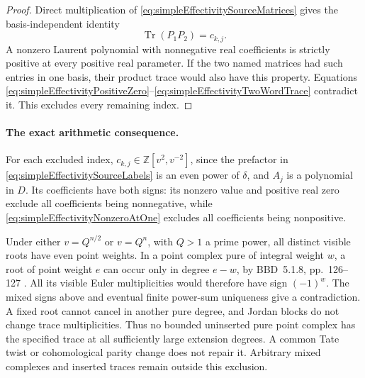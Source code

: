 \begin{proof}
Direct multiplication of
\eqref{eq:simpleEffectivitySourceMatrices} gives the
basis-independent identity
\begin{equation}\label{eq:simpleEffectivityTwoWordTrace}
                    \operatorname{Tr}(P_1P_2)=c_{k,j}.
\end{equation}
A nonzero Laurent polynomial with nonnegative real
coefficients is strictly positive at every positive
real parameter. If the two named matrices had such
entries in one basis, their product trace would also
have this property. Equations
\eqref{eq:simpleEffectivityPositiveZero}--\eqref{eq:simpleEffectivityTwoWordTrace}
contradict it. This excludes every remaining index.
\end{proof}

\paragraph{The exact arithmetic consequence.}
For each excluded index,
\(c_{k,j}\in\mathbb Z[v^2,v^{-2}]\), since the
prefactor in \eqref{eq:simpleEffectivitySourceLabels}
is an even power of \(\delta\), and \(A_j\) is a
polynomial in \(D\). Its coefficients have both signs:
its nonzero value and positive real zero exclude all
coefficients being nonnegative, while
\eqref{eq:simpleEffectivityNonzeroAtOne} excludes all
coefficients being nonpositive.

Under either \(v=Q^{n/2}\) or \(v=Q^n\), with \(Q>1\)
a prime power, all distinct visible roots have even
point weights. In a point complex pure of integral
weight \(w\), a root of point weight \(e\) can occur
only in degree \(e-w\), by BBD~5.1.8, pp.~126--127
\cite{BBD}. All its visible Euler multiplicities
would therefore have sign \((-1)^w\). The mixed signs
above and eventual finite power-sum uniqueness give a
contradiction. A fixed root cannot cancel in another
pure degree, and Jordan blocks do not change trace
multiplicities. Thus no bounded uninserted pure point
complex has the specified trace at all sufficiently
large extension degrees. A common Tate twist or
cohomological parity change does not repair it.
Arbitrary mixed complexes and inserted traces remain
outside this exclusion.

